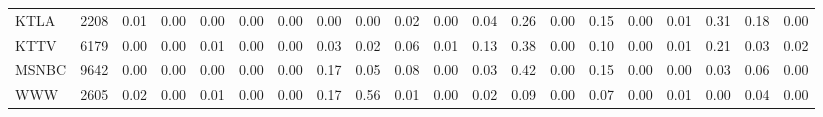 \begin{table}[ht]
\begin{tabular}{lrrrrrrrrrrrrrrrrrrr}
  KTLA & 2208 & 0.01 & 0.00 & 0.00 & 0.00 & 0.00 & 0.00 & 0.00 & 0.02 & 0.00 & 0.04 & 0.26 & 0.00 & 0.15 & 0.00 & 0.01 & 0.31 & 0.18 & 0.00 \\ 
  KTTV & 6179 & 0.00 & 0.00 & 0.01 & 0.00 & 0.00 & 0.03 & 0.02 & 0.06 & 0.01 & 0.13 & 0.38 & 0.00 & 0.10 & 0.00 & 0.01 & 0.21 & 0.03 & 0.02 \\ 
  MSNBC & 9642 & 0.00 & 0.00 & 0.00 & 0.00 & 0.00 & 0.17 & 0.05 & 0.08 & 0.00 & 0.03 & 0.42 & 0.00 & 0.15 & 0.00 & 0.00 & 0.03 & 0.06 & 0.00 \\ 
  WWW & 2605 & 0.02 & 0.00 & 0.01 & 0.00 & 0.00 & 0.17 & 0.56 & 0.01 & 0.00 & 0.02 & 0.09 & 0.00 & 0.07 & 0.00 & 0.01 & 0.00 & 0.04 & 0.00 \\ 
   \hline
\end{tabular}
\end{table}
